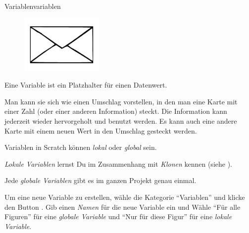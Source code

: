 \documentclass[lerntheke,12pt,a5paper,landscape]{arbeitsblatt}
\begin{document}
\begin{hilfekarte}{Variablen}{variablen}
	\begin{wrapfix}
	\begin{figure}
		\includegraphics[width=4cm]{9Diff-LT.3-Abb_Umschlag.jpg}
	\end{figure}

	Eine Variable ist ein Platzhalter für einen Datenwert.

	Man kann sie sich wie einen Umschlag vorstellen, in den man eine Karte mit einer Zahl (oder einer anderen Information) steckt. Die Information kann jederzeit wieder hervorgeholt und benutzt werden. Es kann auch eine andere Karte mit einem neuen Wert in den Umschlag gesteckt werden.
	\end{wrapfix}

	\smallskip
	\begin{scratch}[scale=0.7]
	\end{scratch}
	\smallskip

	Variablen in Scratch können \emph{lokal} oder \emph{global} sein.
	\begin{smallitem}
		\item \emph{Lokale Variablen} lernst Du im Zusammenhang mit \emph{Klonen} kennen (siehe ).
		\item Jede \emph{globale Variablen} gibt es im ganzen Projekt genau einmal.
	\end{smallitem}

	Um eine neue Variable zu erstellen, wähle die Kategorie \enquote{Variablen} und klicke den Button . Gib einen \emph{Namen} für die  neue Variable ein und Wähle \enquote{Für alle Figuren} für eine \emph{globale Variable} und \enquote{Nur für diese Figur} für eine \emph{lokale Variable}.
\end{hilfekarte}
\end{document}

